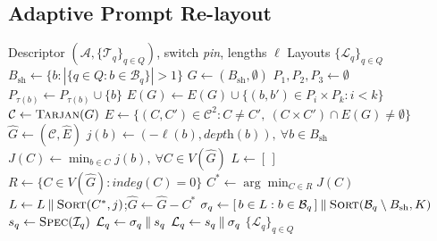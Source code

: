 \subsection{Adaptive Prompt Re-layout}
\label{sec:relayout}
\begin{algorithm}[t]
    \caption{Layout decision }
    \label{alg:layout}
    \small\setlength{\lineskiplimit}{-3pt}
    \begin{algorithmic}[1]
    \Require Descriptor $(\mathcal{A},\{\mathcal{T}_q\}_{q\in Q})$, switch \textit{pin}, lengths $\ell$
    \Ensure Layouts $\{\mathcal{L}_q\}_{q\in Q}$
    \State $B_{\mathrm{sh}} \gets \{b : |\{q\in Q : b\in\mathcal{B}_q\}|>1\}$\label{alg:layout:sh-begin}
    \State $G \gets(B_{\mathrm{sh}},\emptyset)$ 
        \State $P_1,P_2,P_3 \gets \emptyset$
        \Statex {}
            \State $P_{\tau(b)} \gets P_{\tau(b)}\cup\{b\}$ 
        \EndFor
        \State $E(G) \gets E(G)\cup\{(b,b')\in P_i\times P_k : i<k\}$
    \EndFor
    \State $\mathcal{C} \gets \Call{Tarjan}{G}$ 
    \State $\hat{E} \gets \{(C,C')\in\mathcal{C}^2 : C\neq C',\ (C\times C')\cap E(G)\neq\emptyset\}$
    \State $\hat{G} \gets (\mathcal{C},\hat{E})$ 
    \State $j(b) \gets (-\ell(b),\textit{depth}(b)),\ \forall b\in B_{\mathrm{sh}}$
    \State $J(C) \gets \min_{b\in C} j(b),\ \forall C\in V(\hat{G})$
    \State $L \gets [\,]$
     
        \State $R \gets \{C\in V(\hat{G}) : \textit{indeg}(C)=0\}$
        \State $C^{*} \gets \arg\min_{C\in R} J(C)$
        \State $L \gets L \concat \Call{Sort}{C^{*},j}$;\quad $\hat{G} \gets \hat{G}-C^{*}$ \label{alg:layout:sh-end}
    \EndWhile
        \State $\sigma_q \gets [\,b\in L : b\in\mathcal{B}_q\,] \concat \Call{Sort}{\mathcal{B}_q\setminus B_{\mathrm{sh}},K}$ \label{alg:layout:pv}
        \State $s_q \gets \Call{Spec}{\mathcal{I}_q}$  \label{alg:layout:spec-begin}
            \State $\mathcal{L}_q \gets \sigma_q \mathbin{\Vert} s_q$ 
        \Else
            \State $\mathcal{L}_q \gets s_q \mathbin{\Vert} \sigma_q$ 
        \EndIf
        \label{alg:layout:spec-end}
    \EndFor
    \State \Return $\{\mathcal{L}_q\}_{q\in Q}$
    \end{algorithmic}
\end{algorithm}

